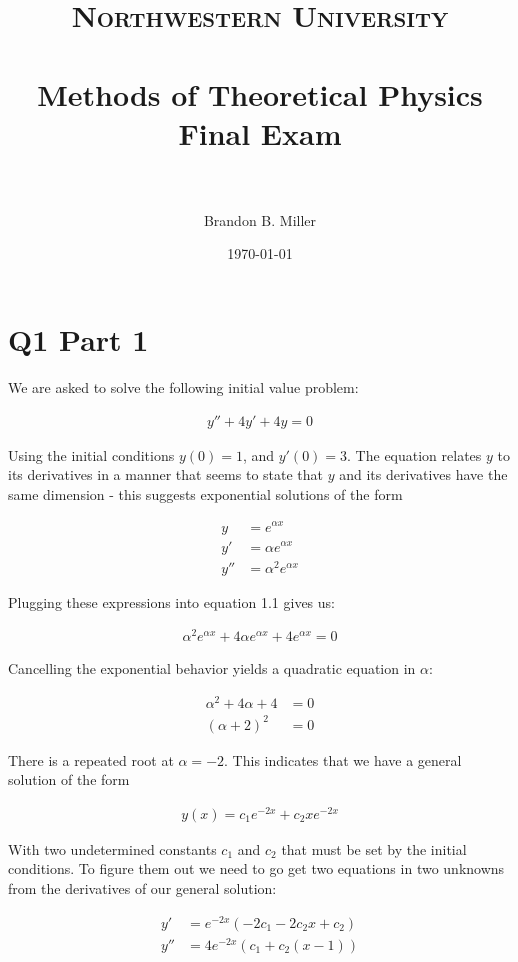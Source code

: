 \documentclass[paper=a4, fontsize=11pt]{scrartcl} %
\title{	
\normalfont \normalsize 
\textsc{Northwestern University} \\ [25pt] %
\horrule{0.5pt} \\[0.4cm] %
\huge Methods of Theoretical Physics Final Exam \\ %
\horrule{2pt} \\[0.5cm] %
}
\author{Brandon B. Miller} %
\date{\normalsize\today} %
\numberwithin{equation}{section} %
\numberwithin{figure}{section} %
\numberwithin{table}{section} %
\begin{document}
\maketitle %

\section{Q1 Part 1}

We are asked to solve the following initial value problem:

\begin{align}
y'' + 4y' + 4y = 0
\end{align}

Using the initial conditions $y(0) = 1$, and $y'(0) = 3$. The equation relates $y$ to its derivatives in a manner that seems to state that $y$ and its derivatives have the same dimension - this suggests exponential solutions of the form

\begin{align}
y &= e^{\alpha x} \\
y' &= \alpha e^{\alpha x} \\
y'' &= \alpha^2 e^{\alpha x}
\end{align} 

Plugging these expressions into equation 1.1 gives us:

\begin{align}
\alpha^2 e^{\alpha x} + 4 \alpha e^{\alpha x} + 4 e^{\alpha x} = 0
\end{align}

Cancelling the exponential behavior yields a quadratic equation in $\alpha$:

\begin{align}
\alpha^2 + 4 \alpha + 4 &= 0 \\
(\alpha + 2)^2 &= 0
\end{align}

There is a repeated root at $\alpha = -2$. This indicates that we have a general solution of the form 

\begin{align}
y(x) = c_1 e^{-2x} + c_2 x e^{-2x}
\end{align}

With two undetermined constants $c_1$ and $c_2$ that must be set by the initial conditions. To figure them out we need to go get two equations in two unknowns from the derivatives of our general solution:

\begin{align}
y' &= e^{-2 x} (-2 c_1 -2 c_2x + c_2) \\
y'' &= 4 e^{-2x} (c_1 + c_2(x-1))
\end{align}
\end{document}
